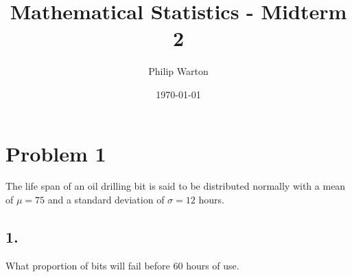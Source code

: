 \documentclass{article}
\theoremstyle{definition}
\begin{document}
\title{Mathematical Statistics - Midterm 2}
\author{Philip Warton}
\date{\today}
\maketitle

\section*{Problem 1}
    The life span of an oil drilling bit is said to be distributed normally with a mean 
    of $\mu = 75$ and a standard deviation of $\sigma = 12$ hours.
    \subsection*{1.}
        What proportion of bits will fail before 60 hours of use.
\end{document}
